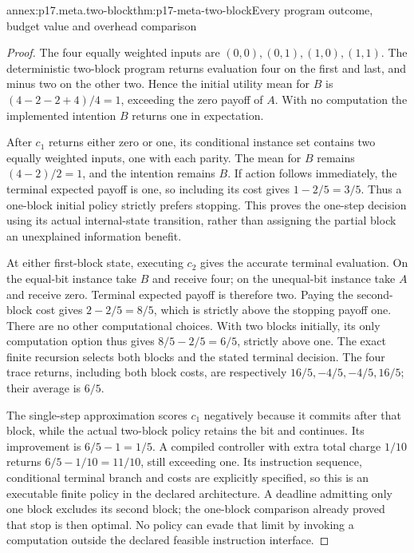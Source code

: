 \begin{annexitem}{annex:p17.meta.two-block}{thm:p17-meta-two-block}{Every program outcome, budget value and overhead comparison}
\begin{proof}
The four equally weighted inputs are \((0,0),(0,1),(1,0),(1,1)\).
The deterministic two-block program returns evaluation four on
the first and last, and minus two on the other two. Hence the
initial utility mean for \(B\) is
\((4-2-2+4)/4=1\), exceeding the zero payoff of \(A\).
With no computation the implemented intention \(B\) returns
one in expectation.

After \(c_1\) returns either zero or one, its conditional
instance set contains two equally weighted inputs, one with each
parity. The mean for \(B\) remains \((4-2)/2=1\), and the
intention remains \(B\). If action follows immediately, the
terminal expected payoff is one, so including its cost gives
\(1-2/5=3/5\). Thus a one-block initial policy strictly prefers
stopping. This proves the one-step decision using its actual
internal-state transition, rather than assigning the partial
block an unexplained information benefit.

At either first-block state, executing \(c_2\) gives the
accurate terminal evaluation. On the equal-bit instance take
\(B\) and receive four; on the unequal-bit instance take \(A\)
and receive zero. Terminal expected payoff is therefore two.
Paying the second-block cost gives \(2-2/5=8/5\), which is
strictly above the stopping payoff one. There are no other
computational choices. With two blocks initially, its only
computation option thus gives
\(8/5-2/5=6/5\), strictly above one. The exact finite recursion
selects both blocks and the stated terminal decision. The four
trace returns, including both block costs, are respectively
\(16/5,-4/5,-4/5,16/5\); their average is \(6/5\).

The single-step approximation scores \(c_1\) negatively because
it commits after that block, while the actual two-block policy
retains the bit and continues. Its improvement is \(6/5-1=1/5\).
A compiled controller with extra total charge \(1/10\) returns
\(6/5-1/10=11/10\), still exceeding one. Its instruction
sequence, conditional terminal branch and costs are explicitly
specified, so this is an executable finite policy in the declared
architecture. A deadline admitting only one block excludes its
second block; the one-block comparison already proved that stop
is then optimal. No policy can evade that limit by invoking a
computation outside the declared feasible instruction interface.
\end{proof}
\end{annexitem}
